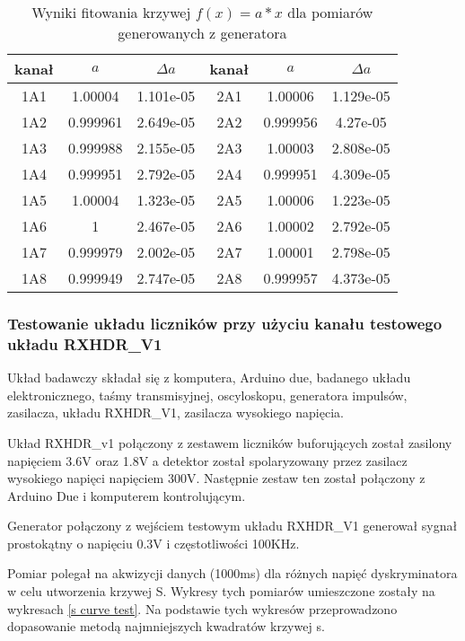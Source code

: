\begin{table}
        \centering
        \caption{Wyniki fitowania krzywej $f(x) = a*x$ dla pomiarów generowanych z generatora}
        \label{multi fit}
        \begin{tabular}{|c|c|c||c|c|c|}
                \hline
                kanał & $a$ & $\Delta a$  &kanał & $a$ & $\Delta a$ \\ \hline
                1A1 & 1.00004 & 1.101e-05 & 2A1 &1.00006&1.129e-05 \\ \hline
                1A2 & 0.999961 &2.649e-05& 2A2 &0.999956&4.27e-05 \\ \hline
                1A3 & 0.999988&2.155e-05&2A3 & 1.00003&2.808e-05\\ \hline
                1A4 & 0.999951&2.792e-05&2A4&0.999951&4.309e-05\\ \hline
                1A5&1.00004&1.323e-05&2A5&1.00006&1.223e-05\\ \hline
                1A6&1&2.467e-05&2A6&1.00002&2.792e-05 \\ \hline
                1A7&0.999979&2.002e-05&2A7&1.00001&2.798e-05 \\ \hline
                1A8 &0.999949&2.747e-05&2A8&0.999957&4.373e-05 \\ \hline
        \end{tabular}
\end{table}



\subsubsection{Testowanie układu liczników przy użyciu kanału testowego układu RXHDR\_V1}
\label{section RXHDR test}

Układ badawczy składał się z komputera, Arduino due, badanego układu elektronicznego, taśmy transmisyjnej, oscyloskopu, generatora impulsów, zasilacza, układu RXHDR\_V1, zasilacza wysokiego napięcia. 

Układ RXHDR\_v1 połączony z zestawem liczników buforujących został zasilony napięciem 3.6V oraz 1.8V a detektor został spolaryzowany przez zasilacz wysokiego napięci napięciem 300V. Następnie zestaw ten został połączony z Arduino Due i komputerem kontrolującym. 

Generator połączony z wejściem testowym układu RXHDR\_V1 generował sygnał prostokątny o napięciu 0.3V i częstotliwości 100KHz. 

Pomiar polegał na akwizycji danych (1000ms) dla różnych napięć dyskryminatora w celu utworzenia krzywej S. Wykresy tych pomiarów umieszczone zostały na wykresach \ref{s curve test}. Na podstawie tych wykresów przeprowadzono dopasowanie metodą najmniejszych kwadratów krzywej s.

